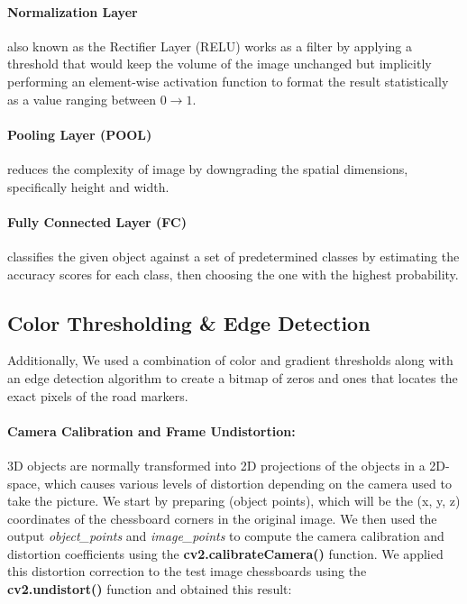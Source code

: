 \paragraph{Normalization Layer} also known as the Rectifier Layer (RELU) works as a filter by applying a threshold that would keep the volume of the image unchanged but implicitly performing an element-wise activation function to format the result statistically as a value ranging between ${0 \rightarrow 1}$. 

\paragraph{Pooling Layer (POOL)} reduces the complexity of image by downgrading the spatial dimensions, specifically height and width.

\paragraph{Fully Connected Layer (FC)} classifies the given object against a set of predetermined classes by estimating the accuracy scores for each class, then choosing the one with the highest probability.



\subsection{Color Thresholding \& Edge Detection} Additionally, We used a combination of color and gradient thresholds along with an edge detection algorithm to create a bitmap of zeros and ones that locates the exact pixels of the road markers. 

\paragraph{Camera Calibration and Frame Undistortion: } 3D objects are normally transformed into 2D projections of the objects in a 2D-space, which causes various levels of distortion depending on the camera used to take the picture. We start by preparing (object points), which will be the (x, y, z) coordinates of the chessboard corners in the original image. We then used the output \textit{object\_points} and \textit{image\_points} to compute the camera calibration and distortion coefficients using the \textbf{cv2.calibrateCamera()} function. We applied this distortion correction to the test image chessboards using the \textbf{cv2.undistort()} function and obtained this result:

